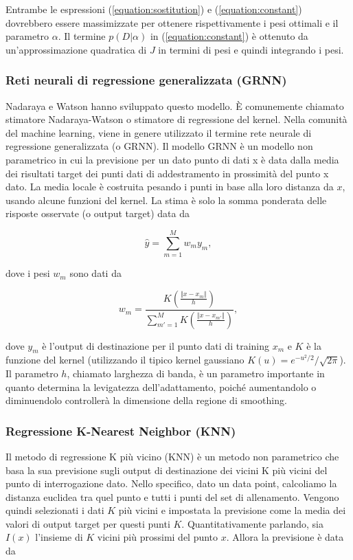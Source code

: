\documentclass[12pt,a4paper]{report}
\begin{document}
Entrambe le espressioni (\ref{equation:sostitution}) e (\ref{equation:constant}) dovrebbero essere massimizzate per ottenere rispettivamente i pesi ottimali e il parametro $\alpha$. Il termine $p(D \vert \alpha)$ in (\ref{equation:constant}) è ottenuto da un'approssimazione quadratica di $J$ in termini di pesi e quindi integrando i pesi. 

\subsubsection{Reti neurali di regressione generalizzata (GRNN)}
Nadaraya e Watson hanno sviluppato questo modello.
È comunemente chiamato stimatore Nadaraya-Watson o stimatore di regressione del kernel. Nella comunità del machine learning, viene in genere utilizzato il termine rete neurale di regressione generalizzata (o GRNN). Il modello GRNN è un modello non parametrico in cui la previsione per un dato punto di dati x è data dalla media dei risultati target dei punti dati di addestramento in prossimità del punto x dato. La media locale è costruita pesando i punti in base alla loro distanza da $x$, usando alcune funzioni del kernel. La stima è solo la somma ponderata delle risposte osservate (o output target) data da

\begin{equation}
    { \displaystyle \hat{y} = \sum\limits_{m=1}^{M} w_my_m},
\end{equation}

dove i pesi $w_m$ sono dati da


\begin{equation}
    { \displaystyle w_m = \frac{K(\frac{\Vert x-x_m \Vert}{h})}{\sum_{m'=1}^{M}K(\frac{\Vert x-x_{m'} \Vert}{h})}},
\end{equation}

dove $y_m$ è l'output di destinazione per il punto dati di training $x_m$ e $K$ è la funzione del kernel (utilizzando il tipico kernel gaussiano $K(u) = e^{-u^2/2} / \sqrt{2\pi}$).
Il parametro $h$, chiamato larghezza di banda, è un parametro importante in quanto determina la levigatezza dell'adattamento, poiché aumentandolo o diminuendolo controllerà la dimensione della regione di smoothing.

\subsubsection{Regressione K-Nearest Neighbor (KNN)}
Il metodo di regressione K più vicino (KNN) è un metodo non parametrico che basa la sua previsione sugli output di destinazione dei vicini K più vicini del punto di interrogazione dato. Nello specifico, dato un data point, calcoliamo la distanza euclidea tra quel punto e tutti i punti del set di allenamento. Vengono quindi selezionati i dati $K$ più vicini e impostata la previsione come la media dei valori di output target per questi punti $K$. Quantitativamente parlando, sia $I(x)$ l'insieme di $K$ vicini più prossimi del punto $x$. Allora la previsione è data da
\end{document}
